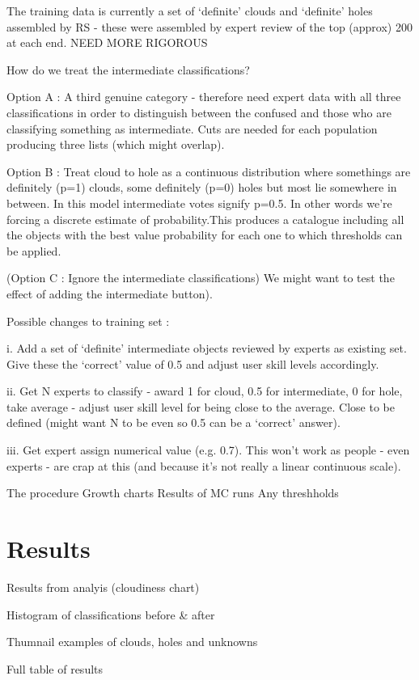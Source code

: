 \documentclass[a4,useAMS,usenatbib]{mn2e}
\begin{document}
The training data is currently a set of `definite' clouds and `definite' holes assembled by RS - these were assembled by expert review of the top (approx) 200 at each end. NEED MORE RIGOROUS

How do we treat the intermediate classifications? 

	Option A : A third genuine category - therefore need expert data with all three classifications in order to distinguish between the confused and those who are classifying something as intermediate. Cuts are needed for each population producing three lists (which might overlap). 
	
	Option B : Treat cloud to hole as a continuous distribution where somethings are definitely (p=1) clouds, some definitely (p=0) holes but most lie somewhere in between. In this model intermediate votes signify p=0.5. In other words we're forcing a discrete estimate of probability.This produces a catalogue including all the objects with the best value probability for each one to which thresholds can be applied. 
	
	(Option C : Ignore the intermediate classifications) We might want to test the effect of adding the intermediate button). 
	
	Possible changes to training set :
	
		i. Add a set of `definite' intermediate objects reviewed by experts as existing set. Give these the `correct' value of 0.5 and adjust user skill levels accordingly.
		
		ii. Get N experts to classify - award 1 for cloud, 0.5 for intermediate, 0 for hole, take average - adjust user skill level for being close to the average. Close to be defined (might want N to be even so 0.5 can be a `correct' answer). 
		
		iii. Get expert assign numerical value (e.g. 0.7). This won't work as people - even experts - are crap at this (and because it's not really a linear continuous scale). 

The procedure
Growth charts
Results of MC runs
Any threshholds


\section{Results}
Results from analyis (cloudiness chart)

Histogram of classifications before \& after

Thumnail examples of clouds, holes and unknowns

Full table of results
\end{document}
